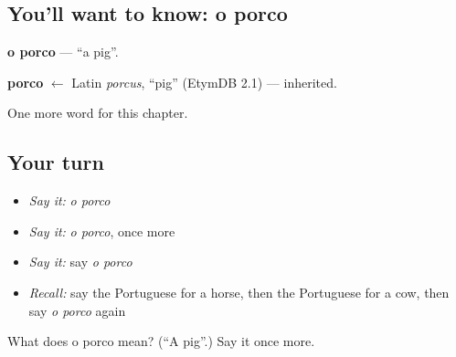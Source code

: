\subsection*{You'll want to know: o porco}
\textbf{o porco} — \textquotedblleft{}a pig\textquotedblright{}.

\begin{cousinweb}
\textbf{porco} $\leftarrow$ Latin \emph{porcus}, \textquotedblleft{}pig\textquotedblright{} (EtymDB 2.1) — inherited.
\end{cousinweb}

\begin{grammarlens}[title={What you've built}]
One more word for this chapter.
\end{grammarlens}

\subsection*{Your turn}
\begin{itemize}
\raggedright
  \item \emph{Say it:} \emph{o porco}
  \item \emph{Say it:} \emph{o porco}, once more
  \item \emph{Say it:} say \emph{o porco}
  \item \emph{Recall:} say the Portuguese for a horse, then the Portuguese for a cow, then say \emph{o porco} again
\end{itemize}

\begin{tcolorbox}[breakable,colback=teal!4,colframe=teal!35!black,title={Before you move on}]
What does o porco mean? (\textquotedblleft{}A pig\textquotedblright{}.) Say it once more.
\end{tcolorbox}
